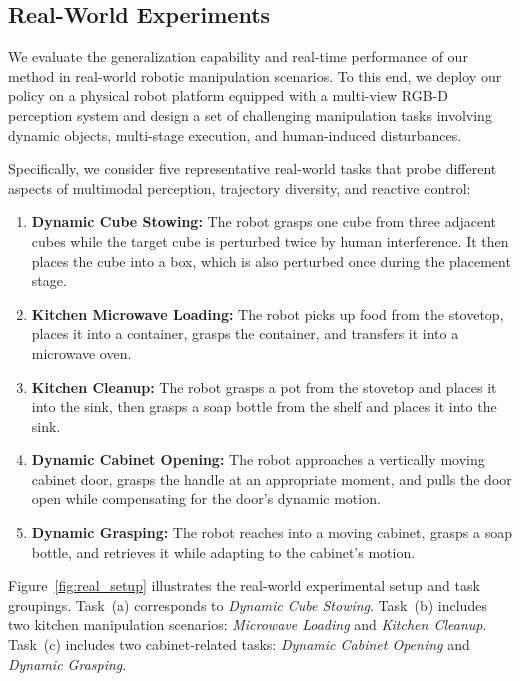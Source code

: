 \subsection{Real-World Experiments}
We evaluate the generalization capability and real-time performance of our method in real-world robotic manipulation scenarios. To this end, we deploy our policy on a physical robot platform equipped with a multi-view RGB-D perception system and design a set of challenging manipulation tasks involving dynamic objects, multi-stage execution, and human-induced disturbances.

Specifically, we consider five representative real-world tasks that probe different aspects of multimodal perception, trajectory diversity, and reactive control:
\begin{enumerate}
    \item \textbf{Dynamic Cube Stowing:} 
    The robot grasps one cube from three adjacent cubes while the target cube is perturbed twice by human interference. It then places the cube into a box, which is also perturbed once during the placement stage.

    \item \textbf{Kitchen Microwave Loading:} 
    The robot picks up food from the stovetop, places it into a container, grasps the container, and transfers it into a microwave oven.

    \item \textbf{Kitchen Cleanup:} 
    The robot grasps a pot from the stovetop and places it into the sink, then grasps a soap bottle from the shelf and places it into the sink.

    \item \textbf{Dynamic Cabinet Opening:} 
    The robot approaches a vertically moving cabinet door, grasps the handle at an appropriate moment, and pulls the door open while compensating for the door’s dynamic motion.

    \item \textbf{Dynamic Grasping:} 
    The robot reaches into a moving cabinet, grasps a soap bottle, and retrieves it while adapting to the cabinet’s motion.
\end{enumerate}

Figure~\ref{fig:real_setup} illustrates the real-world experimental setup and task groupings. 
Task~(a) corresponds to \emph{Dynamic Cube Stowing}. 
Task~(b) includes two kitchen manipulation scenarios: \emph{Microwave Loading} and \emph{Kitchen Cleanup}. 
Task~(c) includes two cabinet-related tasks: \emph{Dynamic Cabinet Opening} and \emph{Dynamic Grasping}.

